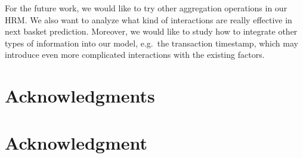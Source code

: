 \documentclass[10pt,journal,compsoc]{IEEEtran}
\begin{document}
For the future work, we would like to try other aggregation operations in our HRM. We also want to analyze what kind of interactions are really effective in next basket prediction. Moreover, we would like to study how to integrate other types of information into our model, e.g.~the transaction timestamp, which may introduce even more complicated interactions with the existing factors.

\ifCLASSOPTIONcompsoc
  \section*{Acknowledgments}
\else
  \section*{Acknowledgment}
\fi

\ifCLASSOPTIONcaptionsoff
  \newpage
\fi





%
%
%



\end{document}
